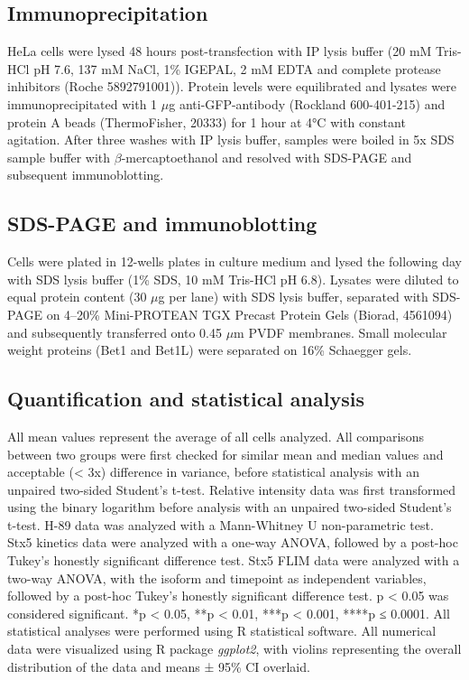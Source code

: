 \subsection{Immunoprecipitation}

HeLa cells were lysed 48 hours post-transfection with IP lysis buffer (20 mM Tris-HCl pH 7.6, 137 mM NaCl, 1\% IGEPAL, 2 mM EDTA and complete protease inhibitors (Roche 5892791001)). Protein levels were equilibrated and lysates were immunoprecipitated with 1 $\mu$g anti-GFP-antibody (Rockland 600-401-215) and protein A beads (ThermoFisher, 20333) for 1 hour at 4°C with constant agitation. After three washes with IP lysis buffer, samples were boiled in 5x SDS sample buffer with $\beta$-mercaptoethanol and resolved with SDS-PAGE and subsequent immunoblotting.

\subsection{SDS-PAGE and immunoblotting}

Cells were plated in 12-wells plates in culture medium and lysed the following day with SDS lysis buffer (1\% SDS, 10 mM Tris-HCl pH 6.8). Lysates were diluted to equal protein content (30 $\mu$g per lane) with SDS lysis buffer, separated with SDS-PAGE on 4–20\% Mini-PROTEAN TGX Precast Protein Gels (Biorad, 4561094) and subsequently transferred onto 0.45 $\mu$m PVDF membranes. Small molecular weight proteins (Bet1 and Bet1L) were separated on 16\% Schaegger gels\cite{schagger_tricinesds-page_2006}.

\subsection{Quantification and statistical analysis}

All mean values represent the average of all cells analyzed. All comparisons between two groups were first checked for similar mean and median values and acceptable (< 3x) difference in variance, before statistical analysis with an unpaired two-sided Student’s t-test. Relative intensity data was first transformed using the binary logarithm before analysis with an unpaired two-sided Student’s t-test. H-89 data was analyzed with a Mann-Whitney U non-parametric test. Stx5 kinetics data were analyzed with a one-way ANOVA, followed by a post-hoc Tukey’s honestly significant difference test. Stx5 FLIM data were analyzed with a two-way ANOVA, with the isoform and timepoint as independent variables, followed by a post-hoc Tukey’s honestly significant difference test. p < 0.05 was considered significant. *p < 0.05, **p < 0.01, ***p < 0.001, ****p ≤ 0.0001. All statistical analyses were performed using R statistical software. All numerical data were visualized using R package \emph{ggplot2}\cite{wickham_ggplot2:_2016}, with violins representing the overall distribution of the data and means ± 95\% CI overlaid. 

